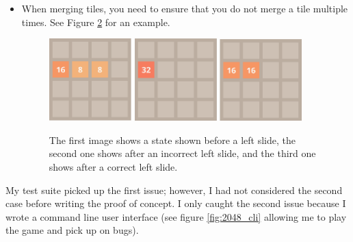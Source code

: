 \documentclass{article}
\begin{document}
\begin{itemize}
\begin{figure}
        \label{fig:slidebug}
    \end{figure}
    \item When merging tiles, you need to ensure that you do not merge a tile multiple times. See Figure \ref{fig:mergebug} for an example.
    \begin{figure}
        \centering
        \includegraphics[width=0.3\textwidth]{2048_merge.png}
        \includegraphics[width=0.3\textwidth]{2048_merge3.png}
        \includegraphics[width=0.3\textwidth]{2048_merge2.png}
        \caption{The first image shows a state shown before a left slide, the second one shows after an incorrect left slide, and the third one shows after a correct left slide.}
        \label{fig:mergebug}
    \end{figure}
\end{itemize}
My test suite picked up the first issue; however, I had not considered the second case before writing the proof of concept. I only caught the second issue because I wrote a command line user interface (see figure \ref{fig:2048_cli} allowing me to play the game and pick up on bugs). 
\end{document}
